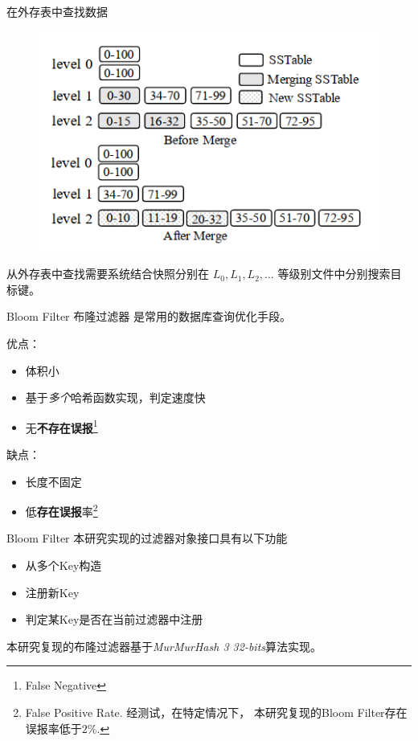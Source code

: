 \documentclass{beamer}
\begin{document}
\begin{frame}{在外存表中查找数据}
    \begin{figure}
        \centering
        \includegraphics[width=0.8\linewidth]{pic/LSM_merging.png}
    \end{figure}

    从外存表中查找需要系统结合快照分别在
    $L_0, L_1, L_2, \dots$
    等级别文件中分别搜索目标键。
\end{frame}

\begin{frame}{Bloom Filter}
    布隆过滤器\cite{burton_h_bloom_spacetime_1970}
    是常用的数据库查询优化手段\cite{luo_lsm-based_2020}。

    优点：
    \begin{itemize}
        \item 体积小
        \item 基于\textit{多个}哈希函数实现，判定速度快
        \item 无\quad\textbf{不存在误报}\footnote{False Negative}
    \end{itemize}

    缺点：
    \begin{itemize}
        \item 长度不固定
        \item 低\quad\textbf{存在误报}率\footnote{
            False Positive Rate. 经测试，在特定情况下，
            本研究复现的Bloom Filter存在误报率低于$2\%$.
        }
    \end{itemize}
\end{frame}

\begin{frame}{Bloom Filter}
    本研究实现的过滤器对象接口具有以下功能
    \begin{itemize}
        \item 从多个Key构造
        \item 注册新Key
        \item 判定某Key是否在当前过滤器中注册
    \end{itemize}

    本研究复现的布隆过滤器基于\textit{MurMurHash 3 32-bits}算法实现。
\end{frame}
\end{document}
